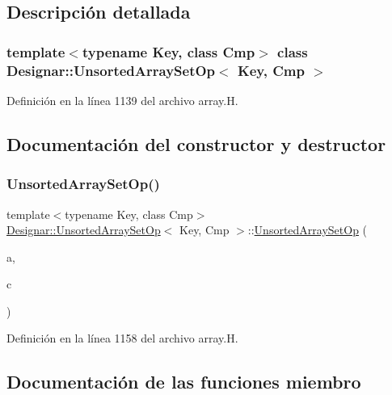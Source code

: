 \subsection{Descripción detallada}
\subsubsection*{template$<$typename Key, class Cmp$>$\newline
class Designar\+::\+Unsorted\+Array\+Set\+Op$<$ Key, Cmp $>$}



Definición en la línea 1139 del archivo array.\+H.



\subsection{Documentación del constructor y destructor}
\mbox{\label{class_designar_1_1_unsorted_array_set_op_a3f01d03aaf449273fd884809764cf841}} 
\subsubsection{\texorpdfstring{Unsorted\+Array\+Set\+Op()}{UnsortedArraySetOp()}}
{\footnotesize\ttfamily template$<$typename Key, class Cmp$>$ \\
\hyperlink{class_designar_1_1_unsorted_array_set_op}{Designar\+::\+Unsorted\+Array\+Set\+Op}$<$ Key, Cmp $>$\+::\hyperlink{class_designar_1_1_unsorted_array_set_op}{Unsorted\+Array\+Set\+Op} (\begin{DoxyParamCaption}\item[{\hyperlink{class_designar_1_1_dyn_array}{Dyn\+Array}$<$ Key $>$ \&}]{a,  }\item[{Cmp \&}]{c }\end{DoxyParamCaption})\hspace{0.3cm}{\ttfamily [inline]}}



Definición en la línea 1158 del archivo array.\+H.



\subsection{Documentación de las funciones miembro}
\mbox{\label{class_designar_1_1_unsorted_array_set_op_adaba74cc7cc8541af17b7324b9ac3eb4}} 
